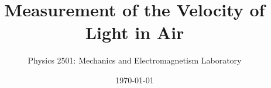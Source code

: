 \documentclass{revtex4}
\begin{document}

\title{Measurement of the Velocity of Light in Air}


\author{Physics 2501: Mechanics and Electromagnetism Laboratory}


\date{\today}




\maketitle

\end{document}
